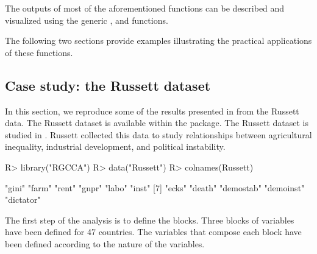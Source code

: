 \documentclass[
]{jss}
\begin{document}
The outputs of most of the aforementioned functions can be described and
visualized using the generic ,  and
 functions.

The following two sections provide examples illustrating the practical
applications of these functions.

\hypertarget{case-study-the-russett-dataset}{%
\subsection{Case study: the Russett
dataset}\label{case-study-the-russett-dataset}}

In this section, we reproduce some of the results presented in
\cite{Tenenhaus2011} from the Russett data. The Russett dataset is
available within the  package. The Russett dataset
\citep{Russett1964} is studied in \cite{Gifi1990}. Russett collected
this data to study relationships between agricultural inequality,
industrial development, and political instability.

\footnotesize

\begin{CodeChunk}
\begin{CodeInput}
R> library("RGCCA")
R> data("Russett")
R> colnames(Russett)
\end{CodeInput}
\begin{CodeOutput}
 [1] "gini"     "farm"     "rent"     "gnpr"     "labo"     "inst"    
 [7] "ecks"     "death"    "demostab" "demoinst" "dictator"
\end{CodeOutput}
\end{CodeChunk}

\normalsize

The first step of the analysis is to define the blocks. Three blocks of
variables have been defined for 47 countries. The variables that compose
each block have been defined according to the nature of the variables.
\end{document}
